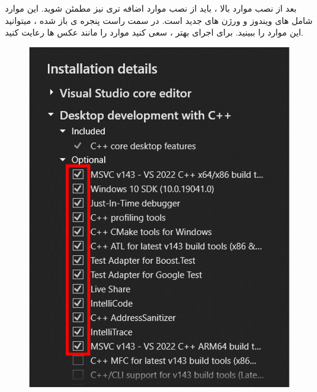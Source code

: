     {\large
    بعد از نصب موارد بالا ، باید از نصب موارد اضافه تری نیز مطمئن شوید. این موارد شامل  های ویندوز و ورژن های جدید  است.
    در سمت راست پنجره ی باز شده ، میتوانید این موارد را ببینید. برای اجرای بهتر ، سعی کنید موارد را مانند عکس ها رعایت کنید.

    }
    \begin{figure}[H]
        \centering
        \setlength{\belowcaptionskip}{-10pt}
        \includegraphics[scale=0.7]{Images/1.Intro.3.1.png} \hspace{5mm}

\end{figure}
